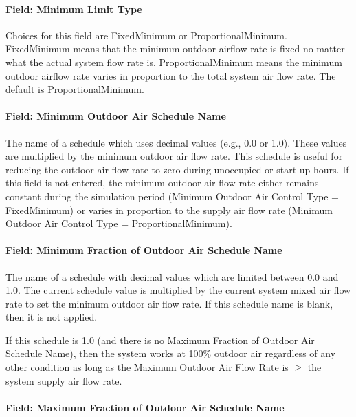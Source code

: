 \paragraph{Field: Minimum Limit Type}\label{field-minimum-limit-type}

Choices for this field are FixedMinimum or ProportionalMinimum. FixedMinimum means that the minimum outdoor airflow rate is fixed no matter what the actual system flow rate is. ProportionalMinimum means the minimum outdoor airflow rate varies in proportion to the total system air flow rate. The default is ProportionalMinimum.

\paragraph{Field: Minimum Outdoor Air Schedule Name}\label{field-minimum-outdoor-air-schedule-name}

The name of a schedule which uses decimal values (e.g., 0.0 or 1.0). These values are multiplied by the minimum outdoor air flow rate. This schedule is useful for reducing the outdoor air flow rate to zero during unoccupied or start up hours. If this field is not entered, the minimum outdoor air flow rate either remains constant during the simulation period (Minimum Outdoor Air Control Type = FixedMinimum) or varies in proportion to the supply air flow rate (Minimum Outdoor Air Control Type = ProportionalMinimum).

\paragraph{Field: Minimum Fraction of Outdoor Air Schedule Name}\label{field-minimum-fraction-of-outdoor-air-schedule-name}

The name of a schedule with decimal values which are limited between 0.0 and 1.0. The current schedule value is multiplied by the current system mixed air flow rate to set the minimum outdoor air flow rate. If this schedule name is blank, then it is not applied.

If this schedule is 1.0 (and there is no Maximum Fraction of Outdoor Air Schedule Name), then the system works at 100\% outdoor air regardless of any other condition as long as the Maximum Outdoor Air Flow Rate is \(\ge\) the system supply air flow rate.

\paragraph{Field: Maximum Fraction of Outdoor Air Schedule Name}\label{field-maximum-fraction-of-outdoor-air-schedule-name}

